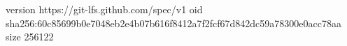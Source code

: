 version https://git-lfs.github.com/spec/v1
oid sha256:60c85699b0e7048eb2e4b07b616f8412a7f2fcf67d842dc59a78300e0acc78aa
size 256122
